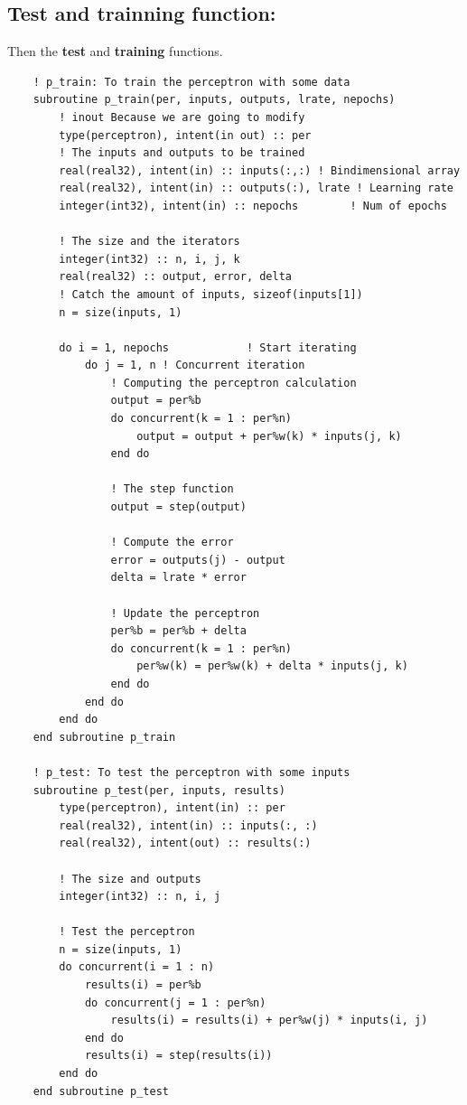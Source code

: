 \documentclass[12pt]{article}
\begin{document}
\subsection{Test and trainning function:}
Then the \textbf{test} and \textbf{training} functions.
\begin{lstlisting}
    ! p_train: To train the perceptron with some data
    subroutine p_train(per, inputs, outputs, lrate, nepochs)
        ! inout Because we are going to modify
        type(perceptron), intent(in out) :: per 
        ! The inputs and outputs to be trained
        real(real32), intent(in) :: inputs(:,:) ! Bindimensional array
        real(real32), intent(in) :: outputs(:), lrate ! Learning rate
        integer(int32), intent(in) :: nepochs        ! Num of epochs

        ! The size and the iterators
        integer(int32) :: n, i, j, k
        real(real32) :: output, error, delta
        ! Catch the amount of inputs, sizeof(inputs[1])
        n = size(inputs, 1)     
        
        do i = 1, nepochs            ! Start iterating
            do j = 1, n ! Concurrent iteration
                ! Computing the perceptron calculation
                output = per%b
                do concurrent(k = 1 : per%n)
                    output = output + per%w(k) * inputs(j, k)
                end do
                
                ! The step function
                output = step(output)

                ! Compute the error 
                error = outputs(j) - output
                delta = lrate * error

                ! Update the perceptron
                per%b = per%b + delta
                do concurrent(k = 1 : per%n)
                    per%w(k) = per%w(k) + delta * inputs(j, k)
                end do
            end do
        end do
    end subroutine p_train

    ! p_test: To test the perceptron with some inputs
    subroutine p_test(per, inputs, results)
        type(perceptron), intent(in) :: per
        real(real32), intent(in) :: inputs(:, :)
        real(real32), intent(out) :: results(:)

        ! The size and outputs
        integer(int32) :: n, i, j
        
        ! Test the perceptron
        n = size(inputs, 1)
        do concurrent(i = 1 : n)
            results(i) = per%b
            do concurrent(j = 1 : per%n)
                results(i) = results(i) + per%w(j) * inputs(i, j)
            end do
            results(i) = step(results(i))
        end do
    end subroutine p_test
\end{lstlisting}
\end{document}
